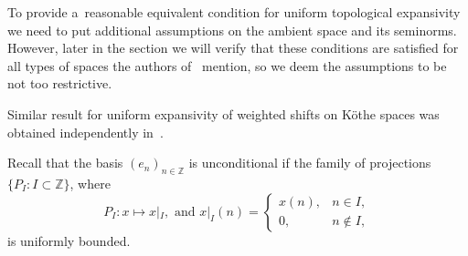 \documentclass[11pt,a4paper]{amsart}
\theoremstyle{definition}
\newcommand{\Z}{\mathbb{Z}}
\begin{document}
	To provide a~reasonable equivalent condition for uniform topological expansivity we need to put additional assumptions on the ambient space and its seminorms. However, later in the section we will verify that these conditions are satisfied for all types of spaces the authors of~\cite{Darji} mention, so we deem the assumptions to be not too restrictive.
	
	Similar result for uniform expansivity of weighted shifts on K\"othe spaces was obtained independently in~\cite[Theorem~11]{bernardes2025notionsexpansivityoperatorslocally}.
	
	Recall that the basis $(e_n)_{n\in\Z}$ is unconditional if the family of projections $\{P_I : I \subset \Z\}$, where
	\begin{equation*}
		P_I: x \mapsto x|_I, \text{ and } x|_I(n) = \begin{cases}
			x(n), &n \in I,\\
			0, &n \notin I,
		\end{cases}
	\end{equation*}
	is uniformly bounded.
	
\end{document}
